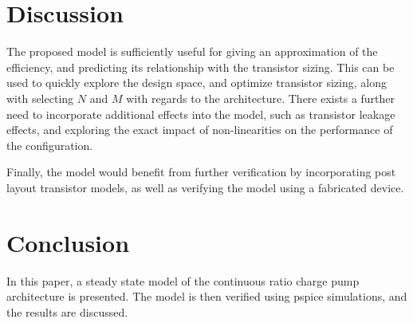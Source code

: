 \documentclass[conference]{IEEEtran}
\begin{document}
 	\section{Discussion}
 	The proposed model is sufficiently useful for giving an approximation of the efficiency, and predicting its relationship with the transistor sizing. This can be used to quickly explore the design space, and optimize transistor sizing, along with selecting $N$ and $M$ with regards to the architecture. There exists a further need to incorporate additional effects into the model, such as transistor leakage effects, and exploring the exact impact of non-linearities on the performance of the configuration. 
 	
 	Finally, the model would benefit from further verification by incorporating post layout transistor models, as well as verifying the model using a fabricated device.
 	
 	\section{Conclusion}
 	In this paper, a steady state model of the continuous ratio charge pump architecture is presented. The model is then verified using pspice simulations, and the results are discussed.
 	
 	
 	
\end{document}
